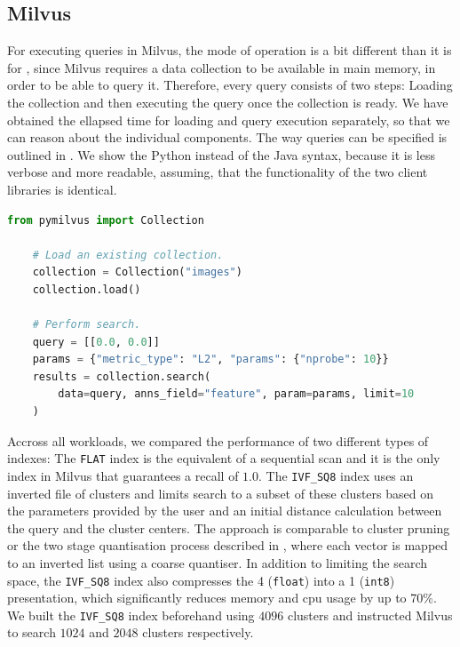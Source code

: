 \subsection{Milvus}
For executing queries in Milvus, the mode of operation is a bit different than it is for \cottontail, since Milvus requires a data collection to be available in main memory, in order to be able to query it. Therefore, every query consists of two steps: Loading the collection and then executing the query once the collection is ready. We have obtained the ellapsed time for loading and query execution separately, so that we can reason about the individual components. The way queries can be specified is outlined in . We show the Python instead of the Java syntax, because it is less verbose and more readable, assuming, that the functionality of the two client libraries is identical.  

\begin{lstlisting}[language=Python, caption={Example of a similarity search query to Milvus in Python on a 2-dimensional vector with the prior loading of a data collection ``images''.}, label=listing:milvus_query, numbers=none]
    from pymilvus import Collection
    
    # Load an existing collection.
    collection = Collection("images")      
    collection.load()

    # Perform search.
    query = [[0.0, 0.0]]
    params = {"metric_type": "L2", "params": {"nprobe": 10}}
    results = collection.search(
        data=query, anns_field="feature", param=params, limit=10
    )
\end{lstlisting}

Accross all workloads, we compared the performance of two different types of indexes: The \texttt{FLAT} index is the equivalent of a sequential scan and it is the only index in Milvus that guarantees a recall of $1.0$. The \texttt{IVF\_SQ8} index uses an inverted file of clusters and limits search to a subset of these clusters based on the parameters provided by the user and an initial distance calculation between the query and the cluster centers. The approach is comparable to cluster pruning \cite{Chierichetti:2007Finding} or the two stage quantisation process described in \cite{Jegou:2010Product}, where each vector is mapped to an inverted list using a coarse quantiser. In addition to limiting the search space, the \texttt{IVF\_SQ8} index also compresses the \SI{4}{\byte} (\texttt{float}) into a \SI{1}{\byte} (\texttt{int8}) presentation, which significantly reduces memory and \acrshort{cpu} usage by up to 70\%. We built the \texttt{IVF\_SQ8} index beforehand using $4096$ clusters and instructed Milvus to search $1024$ and $2048$ clusters respectively.

